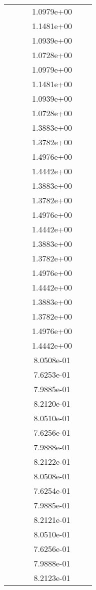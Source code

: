 \begin{xltabular}{\textwidth}{r|rS[table-format=1.3e+2]S[table-format=1.4e+2]S[table-format=1.4e+2]S[table-format=-1.5]}
&  &  & 1.0979e+00 & & \\
&  &  & 1.1481e+00 & & \\
&  &  & 1.0939e+00 & & \\
&  &  & 1.0728e+00 & & \\
&  &  & 1.0979e+00 & & \\
&  &  & 1.1481e+00 & & \\
&  &  & 1.0939e+00 & & \\
&  &  & 1.0728e+00 & & \\
&  &  & 1.3883e+00 & & \\
&  &  & 1.3782e+00 & & \\
&  &  & 1.4976e+00 & & \\
&  &  & 1.4442e+00 & & \\
&  &  & 1.3883e+00 & & \\
&  &  & 1.3782e+00 & & \\
&  &  & 1.4976e+00 & & \\
&  &  & 1.4442e+00 & & \\
&  &  & 1.3883e+00 & & \\
&  &  & 1.3782e+00 & & \\
&  &  & 1.4976e+00 & & \\
&  &  & 1.4442e+00 & & \\
&  &  & 1.3883e+00 & & \\
&  &  & 1.3782e+00 & & \\
&  &  & 1.4976e+00 & & \\
&  &  & 1.4442e+00 & & \\
&  &  & 8.0508e-01 & & \\
&  &  & 7.6253e-01 & & \\
&  &  & 7.9885e-01 & & \\
&  &  & 8.2120e-01 & & \\
&  &  & 8.0510e-01 & & \\
&  &  & 7.6256e-01 & & \\
&  &  & 7.9888e-01 & & \\
&  &  & 8.2122e-01 & & \\
&  &  & 8.0508e-01 & & \\
&  &  & 7.6254e-01 & & \\
&  &  & 7.9885e-01 & & \\
&  &  & 8.2121e-01 & & \\
&  &  & 8.0510e-01 & & \\
&  &  & 7.6256e-01 & & \\
&  &  & 7.9888e-01 & & \\
&  &  & 8.2123e-01 & & \\

\end{xltabular}
